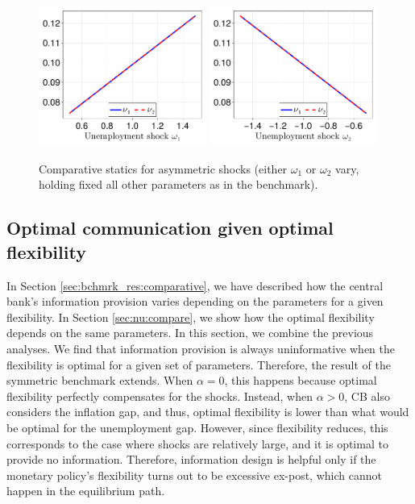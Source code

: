 \documentclass[12pt,a4paper]{article}
\begin{document}
\begin{figure}[h!]
\centering
\includegraphics[width=0.49\textwidth]{figures/V11/γ=10.0-μ_0=0.5-α=1.0-θ=1.0-δ=0.5-ω_1=1.0-ω_2=-1.0/flexibility/fig_optimal_ν_by_ω_1.pdf}
\includegraphics[width=0.49\textwidth]{figures/V11/γ=10.0-μ_0=0.5-α=1.0-θ=1.0-δ=0.5-ω_1=1.0-ω_2=-1.0/flexibility/fig_optimal_ν_by_ω_2.pdf}
\caption{Comparative statics for asymmetric shocks (either $\omega_1$ or $\omega_2$ vary, holding fixed all other parameters as in the benchmark).}
\label{Figure6}
\end{figure}

\subsection{Optimal communication given optimal flexibility}
\label{sec:nu:interaction}

In Section \ref{sec:bchmrk_res:comparative}, we have described how the central bank's information provision varies depending on the parameters for a given flexibility. In Section \ref{sec:nu:compare}, we show how the optimal flexibility depends on the same parameters. In this section, we combine the previous analyses. We find that information provision is always uninformative when the flexibility is optimal for a given set of parameters. Therefore, the result of the symmetric benchmark extends. When $\alpha=0$, this happens because optimal flexibility perfectly compensates for the shocks.
Instead, when $\alpha>0$, CB also considers the inflation gap, and thus, optimal flexibility is lower than what would be optimal for the unemployment gap. However, since flexibility reduces, this corresponds to the case where shocks are relatively large, and it is optimal to provide no information.
Therefore, information design is helpful only if the monetary policy's flexibility turns out to be excessive ex-post, which cannot happen in the equilibrium path.
\end{document}
